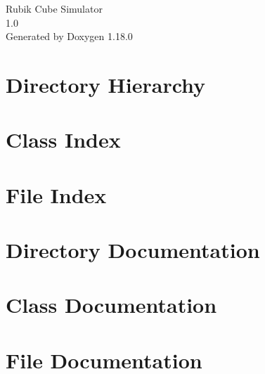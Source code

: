 \documentclass[twoside]{book}
\newcommand{\+}{\discretionary{\mbox{\scriptsize$\hookleftarrow$}}{}{}}
\newcommand{\clearemptydoublepage}{%
    \newpage{\pagestyle{empty}\cleardoublepage}%
  }
\begin{document}
  \raggedbottom
    \hypersetup{pageanchor=false,
                bookmarksnumbered=true,
                pdfencoding=unicode
               }
  \begin{titlepage}
  \vspace*{7cm}
  \begin{center}%
  {\Large Rubik Cube Simulator}\\
  [1ex]\large 1.\+0 \\
  \vspace*{1cm}
  {\large Generated by Doxygen 1.18.0}\\
  \end{center}
  \end{titlepage}
  \clearemptydoublepage
  \tableofcontents
  \clearemptydoublepage
  \hypersetup{pageanchor=true}
\chapter{Directory Hierarchy}

\chapter{Class Index}

\chapter{File Index}

\chapter{Directory Documentation}


\chapter{Class Documentation}

\chapter{File Documentation}




  \backmatter
  \newpage
  \clearemptydoublepage
  \printindex
\end{document}
